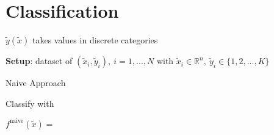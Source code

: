 \section{Classification}

$\tilde{y}(\tilde{x})$ takes values in discrete categories

\textbf{Setup}: dataset of $(\tilde{x}_i,\tilde{y}_i),\ i=1,...,N$ with
$\tilde{x}_i\in\mathbb{R}^{n},\ \tilde{y}_i\in\{1,2,...,K\}$


Naive Approach

Classify with

$f^\text{naive}(\tilde{x})=$
